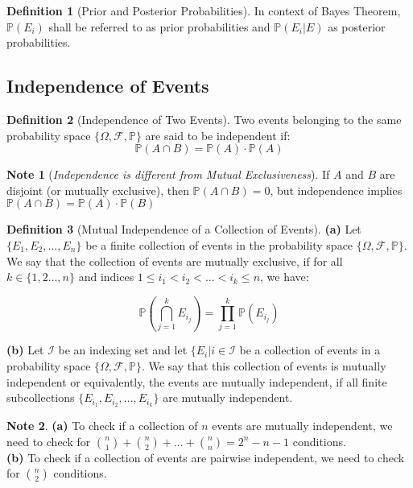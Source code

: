 \documentclass[11pt]{article}
\theoremstyle{definition}
\newtheorem{defn}{Definition}
\newtheorem{note}{Note}
\begin{document}
\begin{defn}[Prior and Posterior Probabilities]
In context of Bayes Theorem, $\mathbb{P}(E_i)$ shall be referred to as prior probabilities and  $\mathbb{P}(E_i | E)$ as posterior probabilities.
\end{defn}


\subsection{Independence of Events}
\begin{defn}[Independence of Two Events]
Two events belonging to the same probability space $\{\Omega, \mathcal{F}, \mathbb{P}\}$ are said to be independent if:
$$
\mathbb{P}(A \cap B) = \mathbb{P}(A)\cdotp \mathbb{P}(A) 
$$
\end{defn}

\begin{note} [\textit{Independence is different from Mutual Exclusiveness}]
If $A$ and $B$ are disjoint (or mutually exclusive), then $\mathbb{P}(A\cap B) = 0$, but independence implies $\mathbb{P}(A\cap B) = \mathbb{P}(A)\cdotp \mathbb{P}(B) $
\end{note}

\begin{defn}[Mutual Independence of a Collection of Events]
\textbf{(a)} Let $\{E_1,E_2,...,E_n\}$ be a finite collection of events in the probability space $\{ \Omega, \mathcal{F}, \mathbb{P} \}$. We say that the collection of events are mutually exclusive, if for all $k \in \{1,2...,n\}$ and indices $1 \leq i_1 < i_2 < ... < i_k \leq n$, we have:

$$
\mathbb{P}(\bigcap_{j = 1}^k E_{i_j}) = \prod_{j = 1}^{k} \mathbb{P}(E_{i_j})
$$

\textbf{(b)} Let $\mathcal{I}$ be an indexing set and let $\{E_i | i \in \mathcal{I}$ be a collection of events in a probability space $\{\Omega, \mathcal{F}, \mathbb{P} \}$. We say that this collection of events is mutually independent or equivalently, the events are mutually independent, if all finite subcollections $\{E_{i_1},E_{i_2}, ... ,E_{i_k} \}$ are mutually independent.
\end{defn}

\begin{note} \textbf{(a)} To check if a collection of $n$ events are mutually independent, we need to check for $\binom{n}{1} + \binom{n}{2} + ... + \binom{n}{n} = 2^n - n -1$ conditions.\\
\textbf{(b)} To check if a collection of events are pairwise independent, we need to check for $\binom{n}{2}$ conditions.
\end{note}
\end{document}
